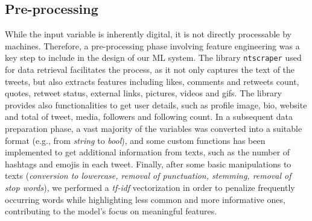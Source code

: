 \documentclass{article}
\begin{document}
\subsection{Pre-processing}\label{ss:pre-processing} 
While the input variable is inherently digital, it is not directly processable by machines. Therefore, a pre-processing phase involving feature engineering was a key step to include in the design of our ML system.
The library \texttt{ntscraper} used for data retrieval facilitates the process, as it not only captures the text of the tweets, but also extracts features including likes, comments and retweets count, quotes, retweet status, external links, pictures, videos and gifs. The library provides also functionalities to get user details, such as profile image, bio, website and total of tweet, media, followers and following count. In a subsequent data preparation phase, a vast majority of the variables was converted into a suitable format (e.g., from \textit{string} to \textit{bool}), and some custom functions has been implemented to get additional information from texts, such as the number of hashtags and emojis in each tweet. Finally, after some basic manipulations to texts (\textit{conversion to lowercase, removal of punctuation, stemming, removal of stop words}), we performed a \textit{tf-idf} vectorization in order to penalize frequently occurring words while highlighting less common and more informative ones, contributing to the model's focus on meaningful features.
\end{document}
